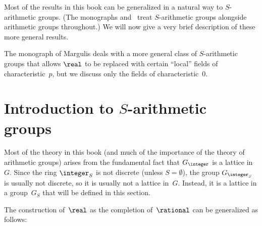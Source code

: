 Most of the results in this book can be generalized in a natural way to $S$-arithmetic groups. (The monographs \cite{MargulisBook} and~\cite{PlatonovRapinchukBook} treat $S$-arithmetic groups alongside arithmetic groups throughout.) We will now give a very brief description of these more general results.

\begin{rem}
The monograph \cite{MargulisBook} of Margulis deals with a more general class of $S$-arithmetic groups that allows $\real$ to be replaced with certain ``local'' fields of characteristic~$p$, but we discuss only the fields of characteristic~$0$. 
\end{rem}





\section{Introduction to \texorpdfstring{$S$}{S}-arithmetic groups} \label{IntroSArithSect}

Most of the theory in this book (and much of the importance of the theory of arithmetic groups) arises from the fundamental fact that $G_{\integer}$ is a lattice in~$G$. Since the ring $\integer_S$ is not discrete (unless $S = \emptyset$), the group $G_{\integer_S}$ is usually not discrete, so it is usually not a lattice in~$G$. Instead, it is a lattice in a group~$G_S$ that will be defined in this section. %

The construction of~$\real$ as the completion of~$\rational$ can be generalized as follows: 

